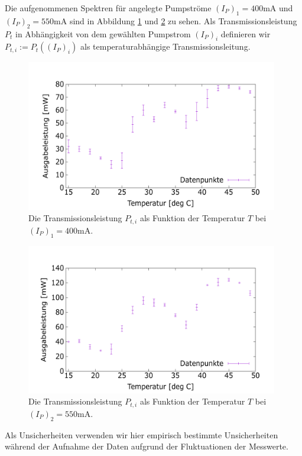 \documentclass[../../main.tex]{subfiles}
\begin{document}
    Die aufgenommenen Spektren für angelegte Pumpströme $(I_P)_1 = 400\si{\mA}$ und $(I_P)_2 = 550\si{\mA}$ sind in Abbildung \ref{fig:TransmissionOverTemperature400mA} und \ref{fig:TransmissionOverTemperature550mA} zu sehen. Als Transmissionsleistung $P_t$ in Abhängigkeit von dem gewählten Pumpstrom $(I_P)_i$ definieren wir $P_{t,i}:=P_t((I_P)_i)$ als temperaturabhängige Transmissionsleitung.

    \begin{figure}[H]
        \centering
        \includegraphics[width=11cm]{../../Bilddateien/1-1/TransmissionOverTemperature400mA.png}
        \caption{Die Transmissionsleistung $P_{t,i}$ als Funktion der Temperatur $T$ bei $(I_P)_1 = 400\si{\mA}$.}
        \label{fig:TransmissionOverTemperature400mA}
    \end{figure}

    \begin{figure}[H]
        \centering
        \includegraphics[width=11cm]{../../Bilddateien/1-1/TransmissionOverTemperature550mA.png}
        \caption{Die Transmissionsleistung $P_{t,i}$ als Funktion der Temperatur $T$ bei $(I_P)_2 = 550\si{\mA}$.}
        \label{fig:TransmissionOverTemperature550mA}
    \end{figure}
    Als Unsicherheiten verwenden wir hier empirisch bestimmte Unsicherheiten während der Aufnahme der Daten aufgrund der Fluktuationen der Messwerte.
\end{document}
